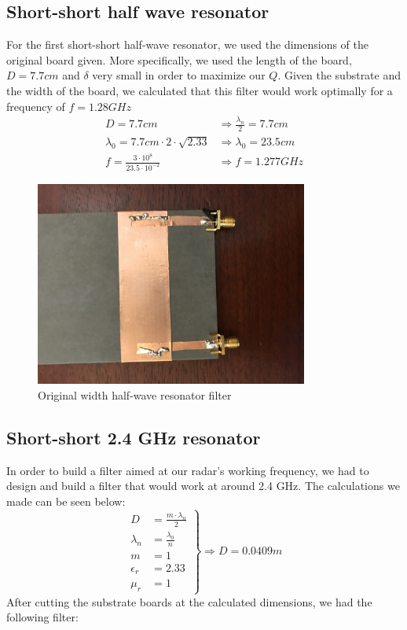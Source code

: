 \documentclass[letterpaper, 12pt]{article}
\begin{document}
\subsection{Short-short half wave resonator}
For the first short-short half-wave resonator, we used the dimensions of the original board given. More specifically, we used the length of the board, $D=7.7cm$ and $\delta$ very small in order to maximize our $Q$. Given the substrate and the width of the board, we calculated that this filter would work optimally for a frequency of $f=1.28 GHz$
\begin{align*}
    D=7.7cm &\Rightarrow \frac{\lambda_n}{2}=7.7cm \\
    \lambda_0=7.7cm\cdot2\cdot\sqrt{2.33}&\Rightarrow \lambda_0=23.5cm \\
    f=\frac{3\cdot10^{8}}{23.5\cdot10^{-2}} &\Rightarrow f=1.277 GHz
\end{align*}

\begin{figure}[H]
    \centering
    \includegraphics[width=0.8\textwidth, angle = 270]{filter1}
    \caption{Original width half-wave resonator filter}
\end{figure}
\subsection{Short-short 2.4 GHz resonator}
In order to build a filter aimed at our radar's working frequency, we had to design and build a filter that would work at around 2.4 GHz. The calculations we made can be seen below:
\begin{equation*}
\left.
\begin{aligned}
    D&=\frac{m\cdot\lambda_n}{2} \\
    \lambda_n&=\frac{\lambda_0}{n}\\
    m&=1 \\
    \epsilon_r&=2.33 \\
    \mu_r&=1
\end{aligned}
\right \}
\Longrightarrow
D=0.0409m
\end{equation*}
After cutting the substrate boards at the calculated dimensions, we had the following filter:
\end{document}
